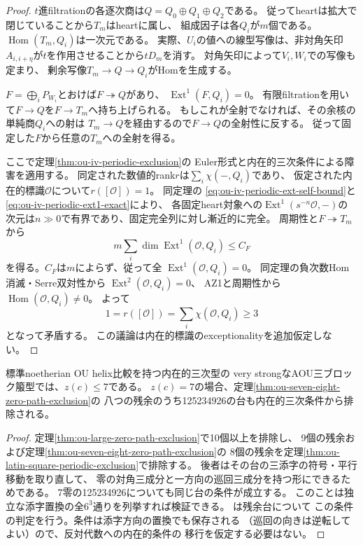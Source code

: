 \begin{proof}
$t$進filtrationの各逐次商は$Q=Q_0\oplus Q_1\oplus Q_2$である。
従ってheartは拡大で閉じていることから$T_m$はheartに属し、
組成因子は各$Q_i$が$m$個である。
$\operatorname{Hom}(T_m,Q_i)$は一次元である。
実際、$U_i$の値への線型写像は、非対角矢印
$A_{i,i+\eta}$が$t$を作用させることから$tD_m$を消す。
対角矢印によって$V_i,W_i$での写像も定まり、
剰余写像$T_m\to Q\to Q_i$がHomを生成する。

$F=\bigoplus_i P_{W_i}$とおけば$F\twoheadrightarrow Q$があり、
$\operatorname{Ext}^1(F,Q_i)=0$。
有限filtrationを用いて$F\to Q$を$F\to T_m$へ持ち上げられる。
もしこれが全射でなければ、その余核の単純商$Q_i$への射は
$T_m\to Q$を経由するので$F\to Q$の全射性に反する。
従って固定した$F$から任意の$T_m$への全射を得る。

ここで定理\ref{thm:ou-iv-periodic-exclusion}の
Euler形式と内在的三次条件による障害を適用する。
同定された数値的rank$r$は$\sum_i\chi(-,Q_i)$であり、
仮定された内在的標識$\mathcal O$について$r([\mathcal O])=1$。
同定理の
\eqref{eq:ou-iv-periodic-ext-self-bound}と
\eqref{eq:ou-iv-periodic-ext1-exact}により、
各固定heart対象への$\operatorname{Ext}^1(s^{-n}\mathcal O,-)$の
次元は$n\gg0$で有界であり、固定完全列に対し漸近的に完全。
周期性と$F\twoheadrightarrow T_m$から
\[
 m\sum_i\dim\operatorname{Ext}^1(\mathcal O,Q_i)\leq C_F
\]
を得る。$C_F$は$m$によらず、従って全
$\operatorname{Ext}^1(\mathcal O,Q_i)=0$。
同定理の負次数Hom消滅・Serre双対性から
$\operatorname{Ext}^2(\mathcal O,Q_i)=0$、
AZ1と周期性から$\operatorname{Hom}(\mathcal O,Q_i)\ne0$。
よって
\[
 1=r([\mathcal O])=\sum_i\chi(\mathcal O,Q_i)\geq3
\]
となって矛盾する。
この議論は内在的標識のexceptionalityを追加仮定しない。
\end{proof}

\begin{corollary}[内在的三次型の零係数上界]
\label{cor:ou-intrinsic-at-most-seven-zeros}
標準noetherian OU helix比較を持つ内在的三次型の
very strongなAOU三ブロック箙型では、$z(c)\leq7$である。
$z(c)=7$の場合、定理\ref{thm:ou-seven-eight-zero-path-exclusion}の
八つの残余のうち125234926の台も内在的三次条件から排除される。
\end{corollary}
\begin{proof}
定理\ref{thm:ou-large-zero-path-exclusion}で10個以上を排除し、
9個の残余および定理\ref{thm:ou-seven-eight-zero-path-exclusion}の
8個の残余を定理\ref{thm:ou-latin-square-periodic-exclusion}で排除する。
後者はその台の三添字の符号・平行移動を取り直して、
零の対角三成分と一方向の巡回三成分を持つ形にできるためである。
7零の125234926についても同じ台の条件が成立する。
このことは独立な添字置換の全$6^3$通りを列挙すれば検証できる。
は残余台について
この条件の判定を行う。条件は添字方向の置換でも保存される
（巡回の向きは逆転してよい）ので、反対代数への内在的条件の
移行を仮定する必要はない。
\end{proof}

